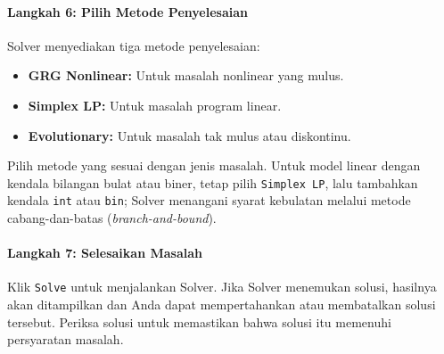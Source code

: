 {\centering
{}\par{}\label{fig:excel-solver-solve}%
\par}

\paragraph{Langkah 6: Pilih Metode Penyelesaian}
Solver menyediakan tiga metode penyelesaian:
\begin{itemize}
    \item \textbf{GRG Nonlinear:} Untuk masalah nonlinear yang mulus.
    \item \textbf{Simplex LP:} Untuk masalah program linear.
    \item \textbf{Evolutionary:} Untuk masalah tak mulus atau diskontinu.
\end{itemize}
Pilih metode yang sesuai dengan jenis masalah. Untuk model linear dengan kendala bilangan bulat atau biner, tetap pilih \texttt{Simplex LP}, lalu tambahkan kendala \texttt{int} atau \texttt{bin}; Solver menangani syarat kebulatan melalui metode cabang-dan-batas (\emph{branch-and-bound}).
{\centering
{}\par{}\label{fig:excel-solver-method}%
\par}

\paragraph{Langkah 7: Selesaikan Masalah}
Klik \texttt{Solve} untuk menjalankan Solver. 
Jika Solver menemukan solusi, hasilnya akan ditampilkan dan Anda dapat mempertahankan atau membatalkan solusi tersebut. Periksa solusi untuk memastikan bahwa solusi itu memenuhi persyaratan masalah.

